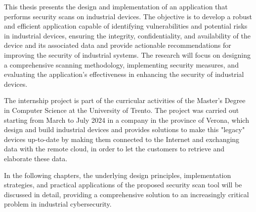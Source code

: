 This thesis presents the design and implementation of an application that performs security scans on industrial devices. The objective is to develop a robust and efficient application capable of identifying vulnerabilities and potential risks in industrial devices, ensuring the integrity, confidentiality, and availability of the device and its associated data and provide actionable recommendations for improving the security of industrial systems. The research will focus on designing a comprehensive scanning methodology, implementing security measures, and evaluating the application's effectiveness in enhancing the security of industrial devices.

The internship project is part of the curricular activities of the Master's Degree in Computer Science at the University of Trento. The project was carried out starting from March to July 2024 in a company in the province of Verona, which design and build industrial devices and provides solutions to make this "legacy" devices up-to-date by making them connected to the Internet and exchanging data with the remote cloud, in order to let the customers to retrieve and elaborate these data.

In the following chapters, the underlying design principles, implementation strategies, and practical applications of the proposed security scan tool will be discussed in detail, providing a comprehensive solution to an increasingly critical problem in industrial cybersecurity.
